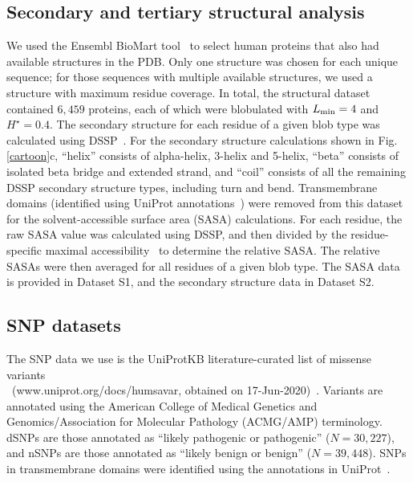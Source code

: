 \documentclass[9pt,twocolumn,twoside,lineno]{pnas-new}
\newcommand{\inserted}[1]{{#1}}
\newcommand{\Ht}{H^{\star}}
\newcommand{\Lmin}{L_{\rm min}}
\begin{document}
\subsection*{Secondary and tertiary structural analysis}
\inserted{We used the Ensembl BioMart tool~\citep{Howe2020} to select human proteins that also had available structures in the PDB. Only one structure was chosen for each unique sequence; for those sequences with multiple available structures, we used a structure with maximum residue coverage. In total, the structural dataset contained $6,459$ proteins, each of which were blobulated with $\Lmin=4$ and $\Ht=0.4$. 
The secondary structure for each residue of a given blob type  was calculated using DSSP~\citep{Kabsch1983, Touw2015}. For the secondary structure calculations shown in Fig. \ref{cartoon}c, ``helix'' consists of alpha-helix, 3-helix and 5-helix, ``beta'' consists of isolated beta bridge and extended strand, and ``coil'' consists of all the remaining DSSP secondary structure types, including turn and bend. Transmembrane domains (identified using UniProt annotations~\citep{Bateman2021}) were removed from this dataset for the solvent-accessible surface area (SASA) calculations. For each residue, the raw SASA value was calculated using DSSP, and then divided by the residue-specific maximal accessibility~\citep{Miller1987} to determine the relative SASA.  The relative SASAs were then averaged for all residues of a given blob type. The SASA data is provided in Dataset S1, and the secondary structure data in Dataset S2.}

\subsection*{SNP datasets}
The SNP data we use is the UniProtKB literature-curated list of missense variants\\ ~(www.uniprot.org/docs/humsavar, obtained on 17-Jun-2020)~\citep{Yip2008}. Variants are annotated using the American College of Medical Genetics and Genomics/Association for Molecular Pathology (ACMG/AMP) terminology\citep{Richards2015}. dSNPs are those annotated as ``likely pathogenic or pathogenic'' ($N=30,227$), and nSNPs are those annotated as ``likely benign or benign'' ($N=39,448$). SNPs in transmembrane domains were identified using the annotations in UniProt~\citep{Bateman2021}.
\end{document}
